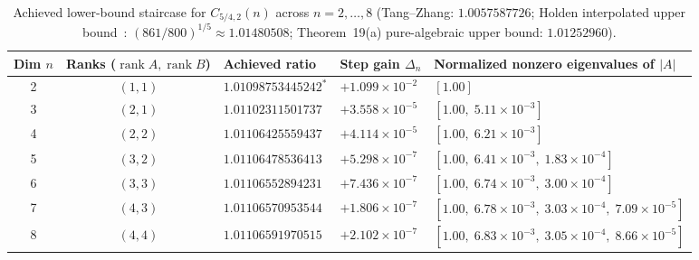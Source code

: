 \documentclass[10pt,letterpaper]{article}
\newcommand{\rank}{\operatorname{rank}}
\begin{document}
\begin{table}[H]
\centering
\caption{\small Achieved lower-bound staircase for $C_{5/4,2}(n)$ across $n = 2,\dots,8$ (Tang--Zhang: $1.0057587726$; Holden interpolated upper bound~\cite{Holden2026b}: $(861/800)^{1/5} \approx 1.01480508$; Theorem~19(a) pure-algebraic upper bound: $1.01252960$).}
\vspace{3pt}
\footnotesize
\begin{tabular}{@{}c c l l l@{}}
\toprule
\textbf{Dim $n$} & \textbf{Ranks ($\rank A, \rank B$)} & \textbf{Achieved ratio} & \textbf{Step gain $\Delta_n$} & \textbf{Normalized nonzero eigenvalues of $|A|$} \\
\midrule
2 & $(1,1)$ & $1.01098753445242^*$ & $+1.099\times 10^{-2}$ & $[1.00]$ \\
3 & $(2,1)$ & $1.01102311501737$   & $+3.558\times 10^{-5}$ & $[1.00,\; 5.11\times 10^{-3}]$ \\
4 & $(2,2)$ & $1.01106425559437$   & $+4.114\times 10^{-5}$ & $[1.00,\; 6.21\times 10^{-3}]$ \\
5 & $(3,2)$ & $1.01106478536413$   & $+5.298\times 10^{-7}$ & $[1.00,\; 6.41\times 10^{-3},\; 1.83\times 10^{-4}]$ \\
6 & $(3,3)$ & $1.01106552894231$   & $+7.436\times 10^{-7}$ & $[1.00,\; 6.74\times 10^{-3},\; 3.00\times 10^{-4}]$ \\
7 & $(4,3)$ & $1.01106570953544$   & $+1.806\times 10^{-7}$ & $[1.00,\; 6.78\times 10^{-3},\; 3.03\times 10^{-4},\; 7.09\times 10^{-5}]$ \\
8 & $(4,4)$ & $1.01106591970515$   & $+2.102\times 10^{-7}$ & $[1.00,\; 6.83\times 10^{-3},\; 3.05\times 10^{-4},\; 8.66\times 10^{-5}]$ \\
\bottomrule
\end{tabular}
\label{tab:p54}
\end{table}
\end{document}
